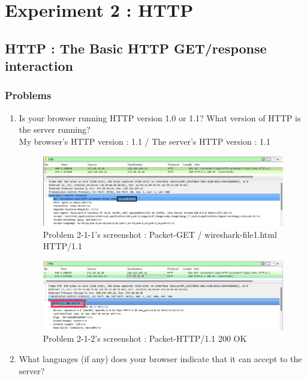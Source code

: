\section{Experiment 2 : HTTP}
\subsection{HTTP : The Basic HTTP GET/response interaction}
    \subsubsection*{Problems}
    \begin{enumerate}[label=\bfseries Problem \arabic*:,leftmargin=*,labelindent=1em]
        \item Is your browser running HTTP version 1.0 or 1.1? What version of HTTP is the server running?\\[0.2mm]
            \soln My browser's HTTP version : 1.1 / The server's HTTP version : 1.1
            \vspace{-2mm}  
            \begin{figure}[!h]\centering
        		\includegraphics[width=.78\textwidth]{image/result_week01/Q2-1-1.png}
        		\caption{\footnotesize Problem 2-1-1's screenshot : Packet-GET / wireshark-file1.html HTTP/1.1}
        		\vspace{-10pt}
            \end{figure}
            \begin{figure}[!h]\centering
        		\includegraphics[width=.79\textwidth]{image/result_week01/Q2-1-2.png}
        		\caption{\footnotesize Problem 2-1-2's screenshot : Packet-HTTP/1.1 200 OK}
        		\vspace{-10pt}
            \end{figure}
        \item What languages (if any) does your browser indicate that it can accept to the server?\\[0.2mm]

\end{enumerate}
